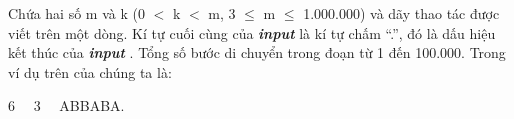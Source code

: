 Chứa hai số m và k (0 $<$ k $<$ m, 3  $\le$  m  $\le$  1.000.000) và dãy thao tác được viết trên một dòng. Kí tự cuối cùng của \textbf{\emph{ input }} là kí tự chấm “.”, đó là dấu hiệu kết thúc của \textbf{\emph{ input }} . Tổng số bước di chuyển trong đoạn từ 1 đến 100.000. Trong ví dụ trên của chúng ta là:

6   3   ABBABA.